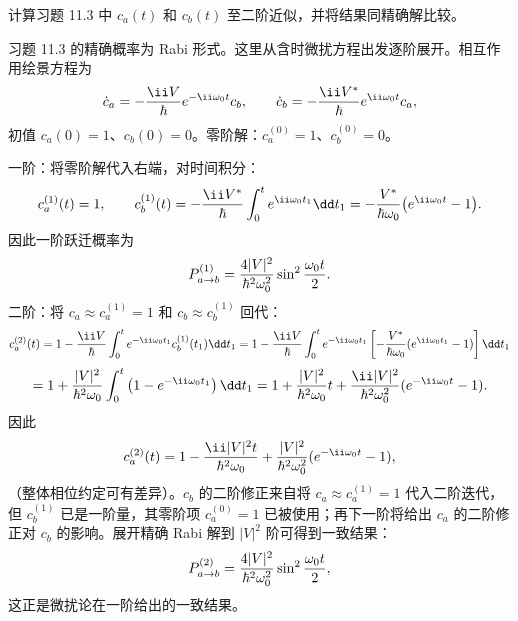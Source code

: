 \begin{question}
计算习题 11.3 中 $c_a(t)$ 和 $c_b(t)$ 至二阶近似，并将结果同精确解比较。
\end{question}
\begin{solution}
习题 11.3 的精确概率为 Rabi 形式。这里从含时微扰方程出发逐阶展开。相互作用绘景方程为
\[
\dot c_a=-{\ii V\over\hbar}e^{-\ii\omega_0t}c_b,\qquad
\dot c_b=-{\ii V^*\over\hbar}e^{\ii\omega_0t}c_a,
\]
初值 $c_a(0)=1$、$c_b(0)=0$。零阶解：$c_a^{(0)}=1$、$c_b^{(0)}=0$。

一阶：将零阶解代入右端，对时间积分：
\[
c_a^{(1)}(t)=1,\qquad
c_b^{(1)}(t)=-{\ii V^*\over\hbar}\int_0^t e^{\ii\omega_0t_1}\dd t_1
=-{V^*\over\hbar\omega_0}\big(e^{\ii\omega_0t}-1\big).
\]
因此一阶跃迁概率为
\[
P_{a\to b}^{(1)}={4|V|^2\over\hbar^2\omega_0^2}\sin^2{\omega_0t\over2}.
\]
二阶：将 $c_a\approx c_a^{(1)}=1$ 和 $c_b\approx c_b^{(1)}$ 回代：
\[
c_a^{(2)}(t)=1-{\ii V\over\hbar}\int_0^t e^{-\ii\omega_0t_1}c_b^{(1)}(t_1)\dd t_1
=1-{\ii V\over\hbar}\int_0^t e^{-\ii\omega_0t_1}\left[-{V^*\over\hbar\omega_0}(e^{\ii\omega_0t_1}-1)\right]\dd t_1
\]
\[
=1+{|V|^2\over\hbar^2\omega_0}\int_0^t\left(1-e^{-\ii\omega_0t_1}\right)\dd t_1
=1+{|V|^2\over\hbar^2\omega_0}t+{\ii|V|^2\over\hbar^2\omega_0^2}(e^{-\ii\omega_0t}-1).
\]
因此
\[
c_a^{(2)}(t)=1-{\ii |V|^2t\over\hbar^2\omega_0}+{ |V|^2\over\hbar^2\omega_0^2}(e^{-\ii\omega_0t}-1),
\]
（整体相位约定可有差异）。$c_b$ 的二阶修正来自将 $c_a\approx c_a^{(1)}=1$ 代入二阶迭代，但 $c_b^{(1)}$ 已是一阶量，其零阶项 $c_a^{(0)}=1$ 已被使用；再下一阶将给出 $c_a$ 的二阶修正对 $c_b$ 的影响。展开精确 Rabi 解到 $|V|^2$ 阶可得到一致结果：
\[
P_{a\to b}^{(2)}={4|V|^2\over\hbar^2\omega_0^2}\sin^2{\omega_0t\over2},
\]
这正是微扰论在一阶给出的一致结果。
\end{solution}

